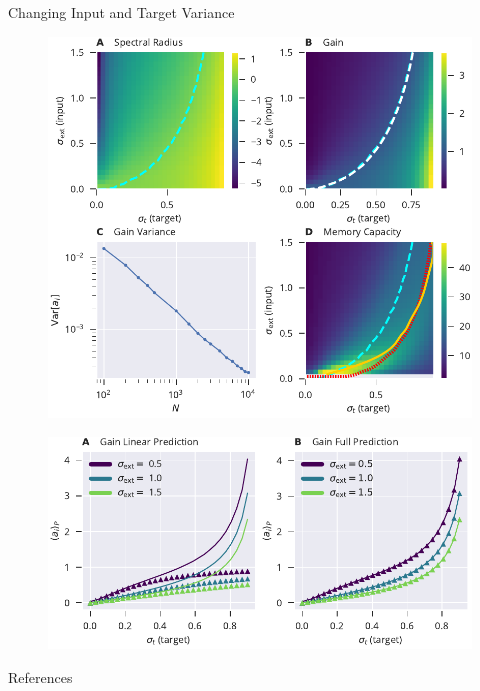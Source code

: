 \documentclass{beamer}
\begin{document}
\begin{frame}[t]
\begin{columns}[t]
\begin{column}{.5\textwidth}
\begin{myblock}{Changing Input and Target Variance}
	\begin{figure}
		\includegraphics[width=\textwidth]{../figures/std_in_std_target_sweep_fig.pdf}
	\end{figure}
	
	\begin{figure}
		\includegraphics[width=\textwidth]{../figures/std_in_std_target_sweep_fig_cut.pdf}
	\end{figure}
\end{myblock}


\begin{myblock}{References}
	
\end{myblock}

\end{column}
\end{columns}
\end{frame}
\end{document}
